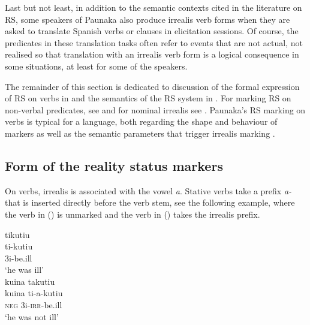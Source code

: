 Last but not least, in addition to the semantic contexts cited in the literature on RS, some speakers of Paunaka also produce irrealis verb forms when they are asked to translate Spanish verbs or clauses in elicitation sessions. Of course, the predicates in these translation tasks often refer to events that are not actual, not realised so that translation with an irrealis verb form is a logical consequence in some situations, at least for some of the speakers. %


The remainder of this section is dedicated to discussion of the formal expression of RS on verbs in  and the semantics of the RS system in . For marking RS on non-verbal predicates, see  and for nominal irrealis see . Paunaka’s RS marking on verbs is typical for a  language, both regarding the shape and behaviour of markers as well as the semantic parameters that trigger irrealis marking \citep[cf.][]{DanielsenTerhartSubm}.


\subsection{Form of the reality status markers}\label{sec:VerbalRS}

On verbs, irrealis is associated with the vowel \textit{a}. Stative verbs  take a prefix \textit{a-} that is inserted directly before the verb stem, see the following example, where the verb in () is unmarked and the verb in () takes the irrealis prefix.

\ea\label{ex:IRR-prefix}
  \ea\label{ex:IRR-prefix.1}
 \begingl 
\glpreamble tikutiu\\
\gla ti-kutiu\\ 
\glb 3i-be.ill\\ 
\glft ‘he was ill’\\ 
\endgl
  \ex\label{ex:IRR-prefix.2}
 \begingl
\glpreamble kuina takutiu\\
\gla kuina ti-a-kutiu\\
\glb \textsc{neg} 3i-\textsc{irr}-be.ill\\
\glft ‘he was not ill’\\
\endgl
\z
\xe
{} 

